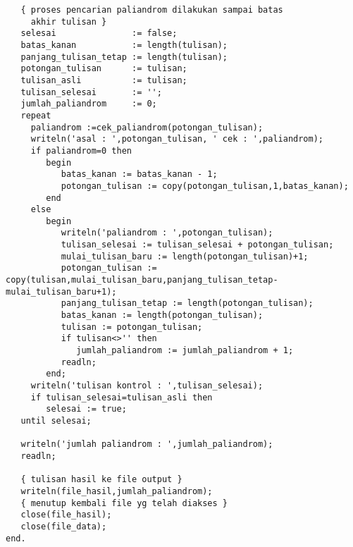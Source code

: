 \documentclass[a4paper,10pt,makeidx]{article}
\begin{document}
\begin{verbatim}
   { proses pencarian paliandrom dilakukan sampai batas
     akhir tulisan }
   selesai               := false;
   batas_kanan           := length(tulisan);
   panjang_tulisan_tetap := length(tulisan);
   potongan_tulisan      := tulisan;
   tulisan_asli          := tulisan;
   tulisan_selesai       := '';
   jumlah_paliandrom     := 0;
   repeat
     paliandrom :=cek_paliandrom(potongan_tulisan);
     writeln('asal : ',potongan_tulisan, ' cek : ',paliandrom);
     if paliandrom=0 then
        begin
           batas_kanan := batas_kanan - 1;
           potongan_tulisan := copy(potongan_tulisan,1,batas_kanan);
        end
     else
        begin
           writeln('paliandrom : ',potongan_tulisan);
           tulisan_selesai := tulisan_selesai + potongan_tulisan;
           mulai_tulisan_baru := length(potongan_tulisan)+1;
           potongan_tulisan := copy(tulisan,mulai_tulisan_baru,panjang_tulisan_tetap-mulai_tulisan_baru+1);
           panjang_tulisan_tetap := length(potongan_tulisan);
           batas_kanan := length(potongan_tulisan);
           tulisan := potongan_tulisan;
           if tulisan<>'' then
              jumlah_paliandrom := jumlah_paliandrom + 1;
           readln;
        end;
     writeln('tulisan kontrol : ',tulisan_selesai);
     if tulisan_selesai=tulisan_asli then
        selesai := true;
   until selesai;

   writeln('jumlah paliandrom : ',jumlah_paliandrom);
   readln;

   { tulisan hasil ke file output }
   writeln(file_hasil,jumlah_paliandrom);
   { menutup kembali file yg telah diakses }
   close(file_hasil);
   close(file_data);
end.
\end{verbatim}
\end{document}
